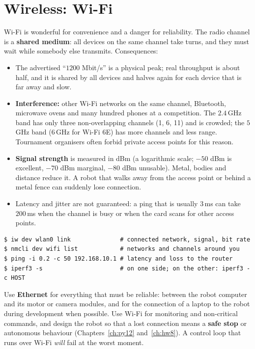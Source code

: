 \section*{Wireless: Wi-Fi}
Wi-Fi is wonderful for convenience and a danger for reliability. The radio channel is a \textbf{shared medium}: all devices on the same channel take turns, and they must wait while somebody else transmits. Consequences:
\begin{itemize}[nosep]
  \item The advertised ``$1200$ Mbit/s'' is a physical peak; real throughput is about half, and it is shared by all devices and halves again for each device that is far away and slow.
  \item \textbf{Interference:} other Wi-Fi networks on the same channel, Bluetooth, microwave ovens and many hundred phones at a competition. The $2.4$\,GHz band has only three non-overlapping channels (1, 6, 11) and is crowded; the $5$\,GHz band ($6$\,GHz for Wi-Fi 6E) has more channels and less range. Tournament organisers often forbid private access points for this reason.
  \item \textbf{Signal strength} is measured in dBm (a logarithmic scale; $-50$ dBm is excellent, $-70$ dBm marginal, $-80$ dBm unusable). Metal, bodies and distance reduce it. A robot that walks away from the access point or behind a metal fence can suddenly lose connection.
  \item Latency and jitter are not guaranteed: a ping that is usually $3$\,ms can take $200$\,ms when the channel is busy or when the card scans for other access points.
\end{itemize}
\begin{verbatim}
$ iw dev wlan0 link              # connected network, signal, bit rate
$ nmcli dev wifi list            # networks and channels around you
$ ping -i 0.2 -c 50 192.168.10.1 # latency and loss to the router
$ iperf3 -s                      # on one side; on the other: iperf3 -c HOST
\end{verbatim}
\begin{keyidea}
Use \textbf{Ethernet} for everything that must be reliable: between the robot computer and its motor or camera modules, and for the connection of a laptop to the robot during development when possible. Use Wi-Fi for monitoring and non-critical commands, and design the robot so that a lost connection means a \textbf{safe stop} or autonomous behaviour (Chapters~\ref{ch:py12} and~\ref{ch:hw8}). A control loop that runs over Wi-Fi \emph{will} fail at the worst moment.
\end{keyidea}

